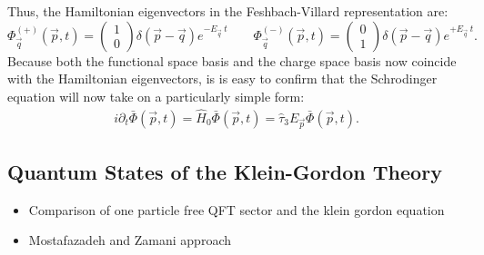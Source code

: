 \documentclass[11pt]{article}
\numberwithin{equation}{section}
\begin{document}
      Thus, the Hamiltonian eigenvectors in the Feshbach-Villard representation are:
      \begin{equation}
        \Phi^{(+)}_{\vec q }(\vec p, t) =  
        \begin{pmatrix}
          1 \\
          0
        \end{pmatrix}
        \delta(\vec p - \vec q)
        e^{- E_{\vec{q}} \ t}
        \qquad
        \Phi^{(-)}_{\vec q }(\vec p, t) =  
        \begin{pmatrix}
          0 \\
          1
        \end{pmatrix}
        \delta(\vec p - \vec q)
        e^{+ E_{\vec{q}} \ t}.
      \end{equation}
      Because both the functional space basis and the charge space basis now coincide with the Hamiltonian eigenvectors,
      is is easy to confirm that the Schrodinger equation will now take on a particularly simple form:
      \begin{gather}
        i \partial_t \bar \Phi(\vec p, t) = \hat H_0 \bar \Phi(\vec p, t) = \hat \tau_3 E_{\vec p} \bar \Phi(\vec p, t).
      \end{gather}




      \subsection{Quantum States of the Klein-Gordon Theory}
      \begin{itemize}
        \item Comparison of one particle free QFT sector and the klein gordon equation
        \item Mostafazadeh and Zamani \cite{kghilbert} approach
      \end{itemize}


\end{document}
